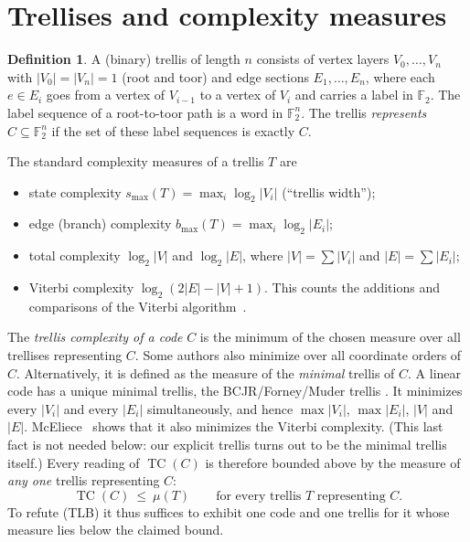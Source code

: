 \documentclass[11pt]{article}
\theoremstyle{definition}
\newtheorem{definition}[theorem]{Definition}
\theoremstyle{remark}
\newcommand{\F}{\mathbb{F}}
\newcommand{\smax}{s_{\max}}
\begin{document}
\section{Trellises and complexity measures}
\begin{definition}
A (binary) trellis of length $n$ consists of vertex layers $V_0,\dots,V_n$ with
$|V_0|=|V_n|=1$ (root and toor) and edge sections $E_1,\dots,E_n$, where each
$e\in E_i$ goes from a vertex of $V_{i-1}$ to a vertex of $V_i$ and carries a label
in $\F_2$. The label sequence of a root-to-toor path is a word in $\F_2^n$. The
trellis \emph{represents} $C\subseteq\F_2^n$ if the set of these label sequences is
exactly $C$.
\end{definition}
The standard complexity measures of a trellis $T$ are
\begin{itemize}
\item state complexity $\smax(T)=\max_i\log_2|V_i|$ (``trellis width'');
\item edge (branch) complexity $b_{\max}(T)=\max_i\log_2|E_i|$;
\item total complexity $\log_2|V|$ and $\log_2|E|$, where $|V|=\sum|V_i|$ and $|E|=\sum|E_i|$;
\item Viterbi complexity $\log_2(2|E|-|V|+1)$. This counts the additions and comparisons of
the Viterbi algorithm~\cite{McEliece}.
\end{itemize}
The \emph{trellis complexity of a code} $C$ is the minimum of the chosen measure
over all trellises representing $C$. Some authors also minimize over all coordinate
orders of $C$. Alternatively, it is defined as the measure of the \emph{minimal}
trellis of $C$. A linear code has a unique minimal trellis, the BCJR/Forney/Muder trellis
\cite{BCJR,Forney,Muder,McEliece,Vardy}. It minimizes every $|V_i|$ and every
$|E_i|$ simultaneously, and hence $\max|V_i|$, $\max|E_i|$, $|V|$ and $|E|$. McEliece~\cite{McEliece}
shows that it also minimizes the Viterbi complexity. (This last fact is not needed below:
our explicit trellis turns out to be the minimal trellis itself.) Every reading of
$\operatorname{TC}(C)$ is therefore bounded above by the measure of \emph{any one} trellis
representing $C$:
\begin{equation}\label{eq:upper}
\operatorname{TC}(C)\ \le\ \mu(T)\qquad\text{for every trellis $T$ representing $C$.}
\end{equation}
To refute (TLB) it thus suffices to exhibit one code and one trellis for it whose
measure lies below the claimed bound.
\end{document}

